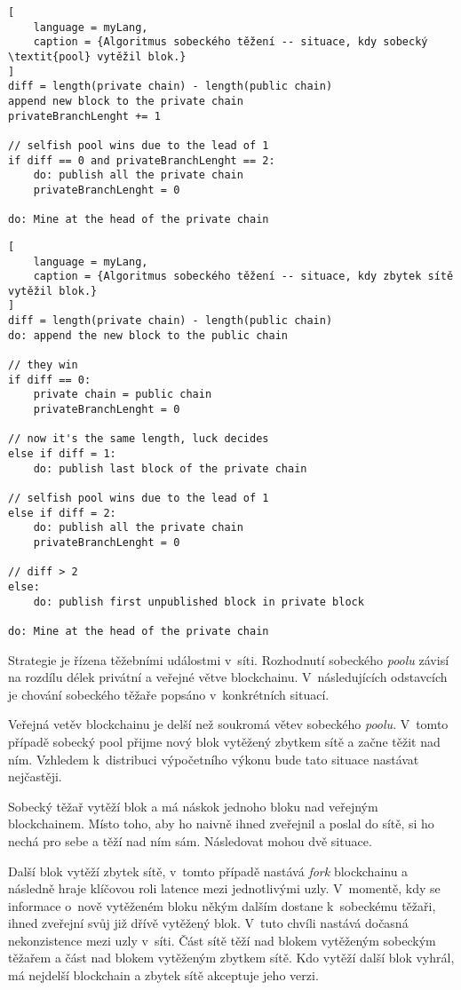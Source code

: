 \bigskip
\begin{lstlisting}[
    language = myLang,
    caption = {Algoritmus sobeckého těžení -- situace, kdy sobecký \textit{pool} vytěžil blok.}
]
diff = length(private chain) - length(public chain)
append new block to the private chain
privateBranchLenght += 1

// selfish pool wins due to the lead of 1
if diff == 0 and privateBranchLenght == 2:
    do: publish all the private chain
    privateBranchLenght = 0

do: Mine at the head of the private chain
\end{lstlisting}

\bigskip
\begin{lstlisting}[
    language = myLang,
    caption = {Algoritmus sobeckého těžení -- situace, kdy zbytek sítě vytěžil blok.}
]
diff = length(private chain) - length(public chain)
do: append the new block to the public chain

// they win
if diff == 0:
    private chain = public chain
    privateBranchLenght = 0

// now it's the same length, luck decides
else if diff = 1:
    do: publish last block of the private chain

// selfish pool wins due to the lead of 1
else if diff = 2:
    do: publish all the private chain
    privateBranchLenght = 0

// diff > 2
else:
    do: publish first unpublished block in private block

do: Mine at the head of the private chain
\end{lstlisting}
\bigskip

Strategie je řízena těžebními událostmi v~síti. Rozhodnutí sobeckého \textit{poolu} závisí na rozdílu délek privátní a veřejné větve blockchainu. V~následujících odstavcích je chování sobeckého těžaře popsáno v~konkrétních situací.

Veřejná vetěv blockchainu je delší než soukromá větev sobeckého \textit{poolu}. V~tomto případě sobecký pool přijme nový blok vytěžený zbytkem sítě a začne těžit nad ním. Vzhledem k~distribuci výpočetního výkonu bude tato situace nastávat nejčastěji.

Sobecký těžař vytěží blok a má náskok jednoho bloku nad veřejným blockchainem. Místo toho, aby ho naivně ihned zveřejnil a poslal do sítě, si ho nechá pro sebe a těží nad ním sám. Následovat mohou dvě situace.

Další blok vytěží zbytek sítě, v~tomto případě nastává \textit{fork} blockchainu a následně hraje klíčovou roli latence mezi jednotlivými uzly. V~momentě, kdy se informace o~nově vytěženém bloku někým dalším dostane k~sobeckému těžaři, ihned zveřejní svůj již dřívě vytěžený blok. V~tuto chvíli nastává dočasná nekonzistence mezi uzly v~síti. Část sítě těží nad blokem vytěženým sobeckým těžařem a část nad blokem vytěženým zbytkem sítě. Kdo vytěží další blok vyhrál, má nejdelší blockchain a zbytek sítě akceptuje jeho verzi.

